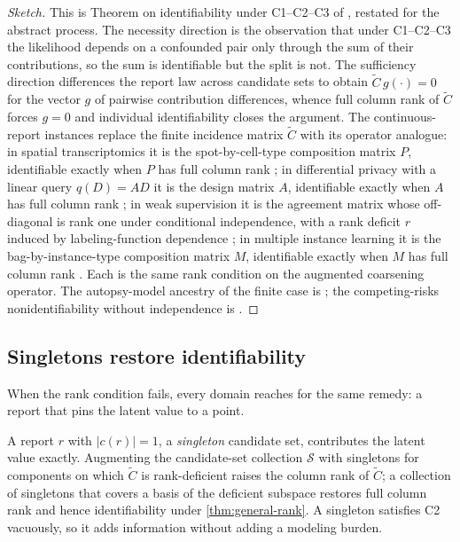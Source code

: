 \begin{proof}[Sketch]
This is Theorem on identifiability under C1--C2--C3 of
\citet{towell2026masked}, restated for the abstract process. The
necessity direction is the observation that under C1--C2--C3 the
likelihood depends on a confounded pair only through the sum of their
contributions, so the sum is identifiable but the split is not. The
sufficiency direction differences the report law across candidate sets
to obtain $\tilde C\, g(\cdot) = 0$ for the vector $g$ of pairwise
contribution differences, whence full column rank of $\tilde C$ forces
$g = 0$ and individual identifiability closes the argument. The
continuous-report instances replace the finite incidence matrix
$\tilde C$ with its operator analogue: in spatial transcriptomics it
is the spot-by-cell-type composition matrix $P$, identifiable exactly
when $P$ has full column rank
\citep{towell2026spatialcoarsening}; in differential privacy with a
linear query $q(D) = AD$ it is the design matrix $A$, identifiable
exactly when $A$ has full column rank \citep{towell2026dpcoarsening};
in weak supervision it is the agreement matrix whose off-diagonal is
rank one under conditional independence, with a rank deficit $r$
induced by labeling-function dependence
\citep{towell2026weaksupcoarsening}; in multiple instance learning it
is the bag-by-instance-type composition matrix $M$, identifiable exactly
when $M$ has full column rank \citep{towell2026milcoarsening}. Each is
the same rank condition
on the augmented coarsening operator. The autopsy-model ancestry of
the finite case is \citet{meilijson1981}; the competing-risks
nonidentifiability without independence is \citet{tsiatis1975}.
\end{proof}

\subsection{Singletons restore identifiability}

When the rank condition fails, every domain reaches for the same
remedy: a report that pins the latent value to a point.

\begin{proposition}
\label{prop:singleton}
A report $r$ with $|c(r)| = 1$, a \emph{singleton} candidate set,
contributes the latent value exactly. Augmenting the candidate-set
collection $\mathcal{S}$ with singletons for components on which
$\tilde C$ is rank-deficient raises the column rank of $\tilde C$; a
collection of singletons that covers a basis of the deficient subspace
restores full column rank and hence identifiability under
\cref{thm:general-rank}. A singleton satisfies C2 vacuously, so it adds
information without adding a modeling burden.
\end{proposition}

